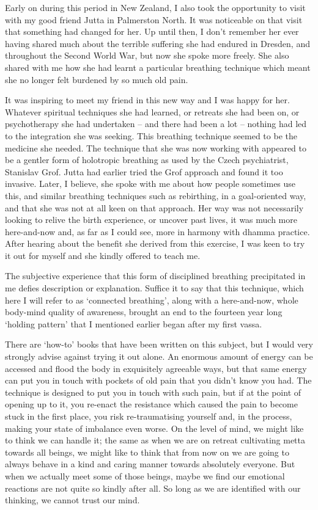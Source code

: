 Early on during this period in New Zealand, I also took the opportunity
to visit with my good friend Jutta in Palmerston North. It was
noticeable on that visit that something had changed for her. Up until
then, I don't remember her ever having shared much about the terrible
suffering she had endured in Dresden, and throughout the Second World
War, but now she spoke more freely. She also shared with me how she had
learnt a particular breathing technique which meant she no longer felt
burdened by so much old pain.

It was inspiring to meet my friend in this new way and I was happy for
her. Whatever spiritual techniques she had learned, or retreats she had
been on, or psychotherapy she had undertaken -- and there had been a lot
-- nothing had led to the integration she was seeking. This breathing
technique seemed to be the medicine she needed. The technique that she
was now working with appeared to be a gentler form of holotropic
breathing as used by the Czech psychiatrist, Stanislav Grof\cite{grof}.
Jutta had earlier tried the Grof approach and found it
too invasive. Later, I believe, she spoke with me about how people
sometimes use this, and similar breathing techniques such as rebirthing,
in a goal-oriented way, and that she was not at all keen on that
approach. Her way was not necessarily looking to relive the birth
experience, or uncover past lives, it was much more here-and-now and, as
far as I could see, more in harmony with dhamma practice. After hearing
about the benefit she derived from this exercise, I was keen to try it
out for myself and she kindly offered to teach me.

The subjective experience that this form of disciplined breathing
precipitated in me defies description or explanation. Suffice it to say
that this technique, which here I will refer to as `connected
breathing', along with a here-and-now, whole body-mind quality of
awareness, brought an end to the fourteen year long `holding pattern'
that I mentioned earlier began after my first vassa.

There are `how-to' books that have been written on this subject, but I
would very strongly advise against trying it out alone. An enormous
amount of energy can be accessed and flood the body in exquisitely
agreeable ways, but that same energy can put you in touch with pockets
of old pain that you didn't know you had. The technique is designed to
put you in touch with such pain, but if at the point of opening up to
it, you re-enact the resistance which caused the pain to become stuck in
the first place, you risk re-traumatising yourself and, in the process,
making your state of imbalance even worse. On the level of mind, we
might like to think we can handle it; the same as when we are on retreat
cultivating metta towards all beings, we might like to think that from
now on we are going to always behave in a kind and caring manner towards
absolutely everyone. But when we actually meet some of those beings,
maybe we find our emotional reactions are not quite so kindly after all.
So long as we are identified with our thinking, we cannot trust our
mind.

